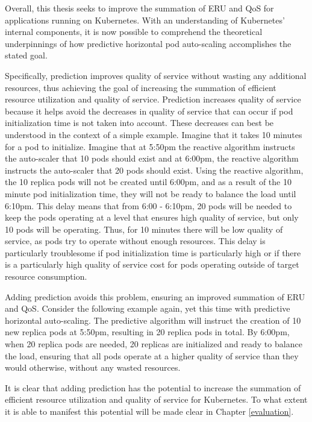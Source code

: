 Overall, this thesis seeks to improve the summation of ERU and QoS for
applications running on Kubernetes.
With an understanding of Kubernetes' internal components, it is now
possible to comprehend the theoretical underpinnings of how predictive
horizontal pod auto-scaling accomplishes the stated goal.

Specifically, prediction improves quality of service without
wasting any additional resources, thus achieving the goal of increasing the
summation of efficient resource utilization and quality of service. Prediction
increases quality of service because it helps avoid the decreases in quality of
service that can occur if pod initialization time is not taken into account.
These decreases can best be understood in the context of a simple example.
Imagine that it takes 10 minutes for a pod to initialize. Imagine that at 5:50pm
the reactive algorithm instructs the auto-scaler that 10 pods should exist and at
6:00pm, the reactive algorithm instructs the auto-scaler that 20 pods should
exist. Using the reactive algorithm, the 10 replica pods will not be created
until 6:00pm, and as a result of the 10 minute pod initialization time, they
will not be ready to balance the load until 6:10pm. This delay means that from
6:00 - 6:10pm, 20 pods will be needed to keep the pods operating at a level that
ensures high quality of service, but only 10 pods will be operating. Thus, for
10 minutes there will be low quality of service, as pods try to operate without
enough resources. This delay is particularly troublesome if pod initialization
time is particularly high or if there is a particularly high quality of service
cost for pods operating outside of target resource consumption.

Adding prediction avoids this problem, ensuring an improved summation of ERU and
QoS. Consider the following example again, yet this time with predictive
horizontal auto-scaling. The predictive algorithm will instruct the creation of 10 new replica
pods at 5:50pm, resulting in 20 replica pods in total.
By 6:00pm, when 20 replica pods are needed, 20 replicas are
initialized and ready to balance the load, ensuring that all pods operate at a
higher quality of service than they would otherwise, without any wasted
resources.

It is clear that adding prediction has the potential to increase the summation
of efficient resource utilization and quality of service for Kubernetes. To what
extent it is able to manifest this potential will be made clear in Chapter
\ref{evaluation}.
